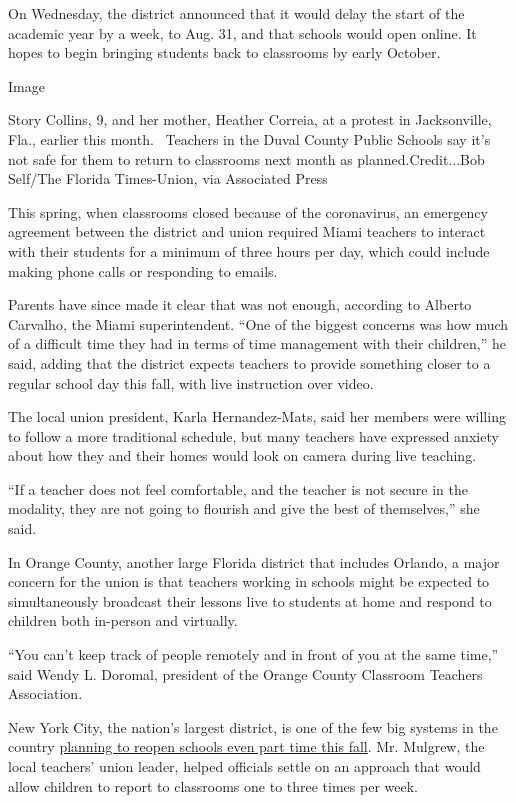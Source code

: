 On Wednesday, the district announced that it would delay the start of
the academic year by a week, to Aug. 31, and that schools would open
online. It hopes to begin bringing students back to classrooms by early
October.

Image

Story Collins, 9, and her mother, Heather Correia, at a protest in
Jacksonville, Fla., earlier this month.~ Teachers in the Duval County
Public Schools say it's not safe for them to return to classrooms next
month as planned.Credit...Bob Self/The Florida Times-Union, via
Associated Press

This spring, when classrooms closed because of the coronavirus, an
emergency agreement between the district and union required Miami
teachers to interact with their students for a minimum of three hours
per day, which could include making phone calls or responding to emails.

Parents have since made it clear that was not enough, according to
Alberto Carvalho, the Miami superintendent. ``One of the biggest
concerns was how much of a difficult time they had in terms of time
management with their children,'' he said, adding that the district
expects teachers to provide something closer to a regular school day
this fall, with live instruction over video.

The local union president, Karla Hernandez-Mats, said her members were
willing to follow a more traditional schedule, but many teachers have
expressed anxiety about how they and their homes would look on camera
during live teaching.

``If a teacher does not feel comfortable, and the teacher is not secure
in the modality, they are not going to flourish and give the best of
themselves,'' she said.

In Orange County, another large Florida district that includes Orlando,
a major concern for the union is that teachers working in schools might
be expected to simultaneously broadcast their lessons live to students
at home and respond to children both in-person and virtually.

``You can't keep track of people remotely and in front of you at the
same time,'' said Wendy L. Doromal, president of the Orange County
Classroom Teachers Association.

New York City, the nation's largest district, is one of the few big
systems in the country
\href{https://www.nytimes3xbfgragh.onion/2020/07/08/nyregion/nyc-schools-reopening-plan.html}{planning
to reopen schools even part time this fall}. Mr. Mulgrew, the local
teachers' union leader, helped officials settle on an approach that
would allow children to report to classrooms one to three times per
week.

